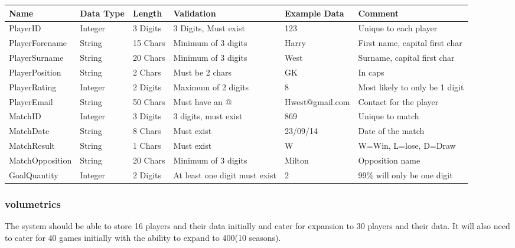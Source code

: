 \begin{table}[H]
\centering
\label{my-label}
\begin{tabular}{|p{2.5cm}|p{1cm}|p{1.5cm}|p{2.5cm}|p{2.5cm}|p{2.5cm}|} 
\hline
Name            & Data Type & Length   & Validation                    & Example Data    & Comment                        \\ \hline
PlayerID        & Integer   & 3 Digits & 3 Digits, Must exist          & 123             & Unique to each player          \\ \hline
PlayerForename  & String    & 15 Chars & Minimum of 3 digits           & Harry           & First name, capital first char \\ \hline
PlayerSurname   & String    & 20 Chars & Minimum of 3 digits           & West            & Surname, capital first char    \\ \hline
PlayerPosition  & String    & 2 Chars  & Must be 2 chars               & GK              & In caps                        \\ \hline
PlayerRating    & Integer   & 2 Digits & Maximum of 2 digits           & 8               & Most likely to only be 1 digit \\ \hline
PlayerEmail     & String    & 50 Chars & Must have an @                & Hwest@gmail.com & Contact for the player         \\ \hline
MatchID         & Integer   & 3 Digits & 3 digits, must exist          & 869             & Unique to match                \\ \hline
MatchDate       & String    & 8 Chars  & Must exist                    & 23/09/14        & Date of the match              \\ \hline
MatchResult     & String    & 1 Chars  & Must exist                    & W               & W=Win, L=lose, D=Draw          \\ \hline
MatchOpposition & String    & 20 Chars & Minimum of 3 digits           & Milton          & Opposition name                \\ \hline
GoalQuantity    & Integer   & 2 Digits & At least one digit must exist & 2               & 99\% will only be one digit    \\ \hline
\end{tabular}
\end{table}

\subsubsection{volumetrics}
The system should be able to store 16 players and their data initially and cater for expansion to 30 players and their data. It will also need to cater for 40 games initially with the ability to expand to 400(10 seasons). 
